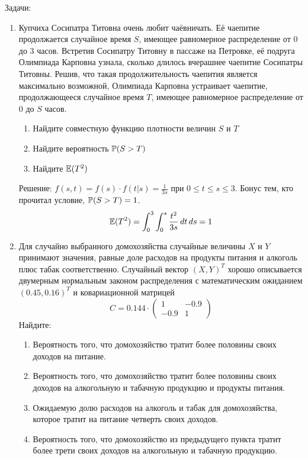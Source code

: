 \documentclass[12pt, a4paper]{article}\usepackage[]{graphicx}\usepackage[]{color}
\begin{document}
				Задачи:
				\begin{enumerate}
					\item Купчиха Сосипатра Титовна очень любит чаёвничать. Её чаепитие продолжается случайное время $S$, имеющее равномерное распределение от 0 до 3 часов.  Встретив Сосипатру Титовну в пассаже на Петровке, её подруга Олимпиада Карповна узнала, сколько длилось вчерашнее чаепитие Сосипатры Титовны. Решив, что такая продолжительность чаепития является максимально возможной, Олимпиада Карповна устраивает чаепитие, продолжающееся случайное время $T$, имеющее равномерное распределение от 0 до $S$ часов.
					\begin{enumerate}
						\item Найдите совместную функцию плотности величин $S$ и $T$
						\item Найдите вероятность $\P(S>T)$
						\item Найдите $\E(T^2)$
					\end{enumerate}

					Решение: $f(s,t)=f(s)\cdot f(t|s)=\frac{1}{3s}$ при $0\leq t\leq s\leq 3$. Бонус тем, кто прочитал условие, $\P(S>T)=1$.
					\[ \E(T^2)=\int_0^3\int_0^s \frac{t^2}{3s}\,dt\,ds=1 \]

					\item  Для случайно выбранного домохозяйства случайные величины $X$ и $Y$ принимают значения, равные доле расходов на продукты питания и алкоголь плюс табак соответственно. Случайный вектор $(X,Y)^T$  хорошо описывается двумерным нормальным законом распределения с математическим ожиданием $(0.45, 0.16)^T$ и ковариационной матрицей
					\[
					C=0.144\cdot
					\left(\begin{array}{cc}
					1 & -0.9 \\
					-0.9 & 1
					\end{array}\right)
					\]
					Найдите:
					\begin{enumerate}
						\item Вероятность того, что домохозяйство тратит более половины своих доходов на питание.
						\item Вероятность того, что домохозяйство тратит более половины своих доходов на алкогольную и табачную продукцию и продукты питания.
						\item Ожидаемую долю расходов на алкоголь и табак для домохозяйства, которое тратит на питание четверть своих доходов.
						\item Вероятность того, что домохозяйство из предыдущего пункта тратит более трети своих доходов на алкогольную и табачную продукцию.


\end{enumerate}
\end{enumerate}
\end{document}
